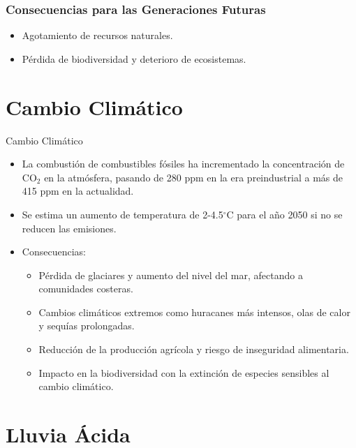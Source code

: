 \documentclass[main.tex]{subfiles}
\begin{document}
\begin{frame}
    \frametitle{Consecuencias para las Generaciones Futuras}
    \begin{itemize}
        \item Agotamiento de recursos naturales.
        \item Pérdida de biodiversidad y deterioro de ecosistemas.
    \end{itemize}
\end{frame}







\section{Cambio Climático}

\begin{frame}{Cambio Climático}
    \begin{itemize}
        \item La combustión de combustibles fósiles ha incrementado la concentración de CO$_2$ en la atmósfera, pasando de 280 ppm en la era preindustrial a más de 415 ppm en la actualidad.
        \item Se estima un aumento de temperatura de 2-4.5$^{\circ}$C para el año 2050 si no se reducen las emisiones.
        \item Consecuencias:
        \begin{itemize}
            \item Pérdida de glaciares y aumento del nivel del mar, afectando a comunidades costeras.
            \item Cambios climáticos extremos como huracanes más intensos, olas de calor y sequías prolongadas.
            \item Reducción de la producción agrícola y riesgo de inseguridad alimentaria.
            \item Impacto en la biodiversidad con la extinción de especies sensibles al cambio climático.
        \end{itemize}
    \end{itemize}
\end{frame}

\section{Lluvia Ácida}
\end{document}
